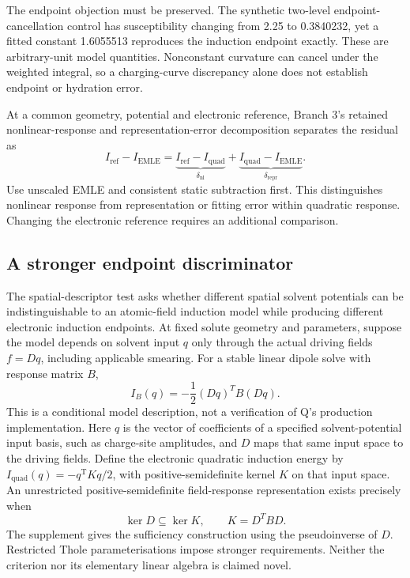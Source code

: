 \documentclass{article}
\begin{document}
The endpoint objection must be preserved. The synthetic two-level endpoint-cancellation control has susceptibility changing from 2.25 to 0.3840232, yet a fitted constant 1.6055513 reproduces the induction endpoint exactly. These are arbitrary-unit model quantities. Nonconstant curvature can cancel under the weighted integral, so a charging-curve discrepancy alone does not establish endpoint or hydration error.

At a common geometry, potential and electronic reference, Branch 3's retained nonlinear-response and representation-error decomposition separates the residual as
\begin{equation*}
I_{\mathrm{ref}}-I_{\mathrm{EMLE}}=
\underbrace{I_{\mathrm{ref}}-I_{\mathrm{quad}}}_{\delta_{\mathrm{nl}}}
+\underbrace{I_{\mathrm{quad}}-I_{\mathrm{EMLE}}}_{\delta_{\mathrm{repr}}}.
\end{equation*}
Use unscaled EMLE and consistent static subtraction first. This distinguishes nonlinear response from representation or fitting error within quadratic response. Changing the electronic reference requires an additional comparison.

\subsection{A stronger endpoint discriminator}

The spatial-descriptor test asks whether different spatial solvent potentials can be indistinguishable to an atomic-field induction model while producing different electronic induction endpoints. At fixed solute geometry and parameters, suppose the model depends on solvent input $q$ only through the actual driving fields $f=Dq$, including applicable smearing. For a stable linear dipole solve with response matrix $B$,
\begin{equation*}
I_B(q)=-\frac12(Dq)^TB(Dq).
\end{equation*}
This is a conditional model description, not a verification of Q's production implementation. Here $q$ is the vector of coefficients of a specified solvent-potential input basis, such as charge-site amplitudes, and $D$ maps that same input space to the driving fields. Define the electronic quadratic induction energy by $I_{\mathrm{quad}}(q)=-q^{\mathrm T}Kq/2$, with positive-semidefinite kernel $K$ on that input space. An unrestricted positive-semidefinite field-response representation exists precisely when
\begin{equation*}
\operatorname{ker}D\subseteq\operatorname{ker}K,\qquad K=D^TBD.
\end{equation*}
The supplement gives the sufficiency construction using the pseudoinverse of $D$. Restricted Thole parameterisations impose stronger requirements. Neither the criterion nor its elementary linear algebra is claimed novel.
\end{document}
